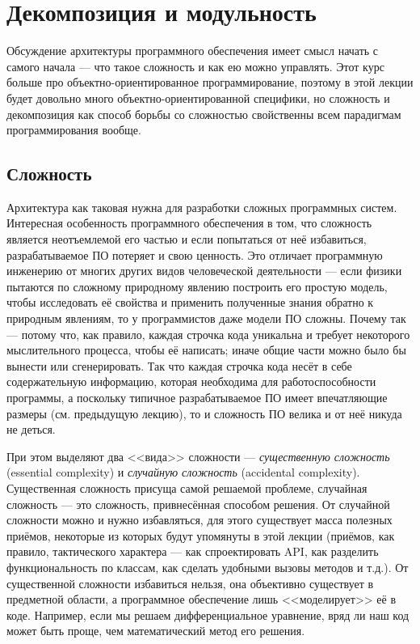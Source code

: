 \documentclass{../text-style}
\begin{document}
\maketitle
\thispagestyle{empty}

\section{Декомпозиция и модульность}


Обсуждение архитектуры программного обеспечения имеет смысл начать с самого начала --- что такое сложность и как ею можно управлять. Этот курс больше про объектно-ориентированное программирование, поэтому в этой лекции будет довольно много объектно-ориентированной специфики, но сложность и декомпозиция как способ борьбы со сложностью свойственны всем парадигмам программирования вообще.

\subsection{Сложность}

Архитектура как таковая нужна для разработки сложных программных систем. Интересная особенность программного обеспечения в том, что сложность является неотъемлемой его частью и если попытаться от неё избавиться, разрабатываемое ПО потеряет и свою ценность. Это отличает программную инженерию от многих других видов человеческой деятельности --- если физики пытаются по сложному природному явлению построить его простую модель, чтобы исследовать её свойства и применить полученные знания обратно к природным явлениям, то у программистов даже модели ПО сложны. Почему так --- потому что, как правило, каждая строчка кода уникальна и требует некоторого мыслительного процесса, чтобы её написать; иначе общие части можно было бы вынести или сгенерировать. Так что каждая строчка кода несёт в себе содержательную информацию, которая необходима для работоспособности программы, а поскольку типичное разрабатываемое ПО имеет впечатляющие размеры (см. предыдущую лекцию), то и сложность ПО велика и от неё никуда не деться.

При этом выделяют два <<вида>> сложности --- \textit{существенную сложность} (essential complexity) и \textit{случайную сложность} (accidental complexity). Существенная сложность присуща самой решаемой проблеме, случайная сложность --- это сложность, привнесённая способом решения. От случайной сложности можно и нужно избавляться, для этого существует масса полезных приёмов, некоторые из которых будут упомянуты в этой лекции (приёмов, как правило, тактического характера --- как спроектировать API, как разделить функциональность по классам, как сделать удобными вызовы методов и т.д.). От существенной сложности избавиться нельзя, она объективно существует в предметной области, а программное обеспечение лишь <<моделирует>> её в коде. Например, если мы решаем дифференциальное уравнение, вряд ли наш код может быть проще, чем математический метод его решения.
\end{document}
